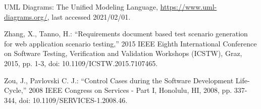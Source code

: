 \documentclass[a4paper,10pt, bibliography=totocnumbered]{scrreprt}
\begin{document}
\begin{thebibliography}{9}
 UML Diagrams: The Unified Modeling Language, \url{https://www.uml-diagrams.org/}, last accessed 2021/02/01.

 Zhang, X., Tanno, H.: \enquote{Requirements document based test scenario generation for web application scenario testing,} 2015 IEEE Eighth International Conference on Software Testing, Verification and Validation Workshops (ICSTW), Graz, 2015, pp. 1-3, doi: 10.1109/ICSTW.2015.7107465.

 Zou, J., Pavlovski C. J.: \enquote{Control Cases during the Software Development Life-Cycle,} 2008 IEEE Congress on Services - Part I, Honolulu, HI, 2008, pp. 337-344, doi: 10.1109/SERVICES-1.2008.46.

\end{thebibliography}

\listoffigures

\listoftables
\end{document}

